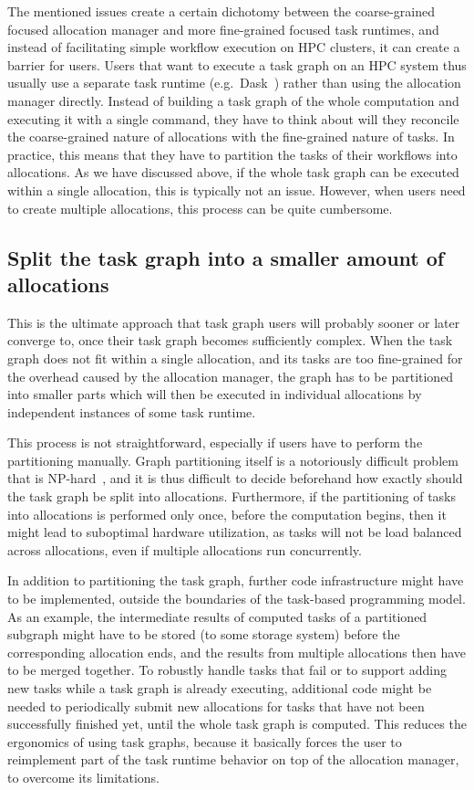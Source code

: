 The mentioned issues create a certain dichotomy between the coarse-grained focused allocation
manager and more fine-grained focused task runtimes, and instead of facilitating simple workflow
execution on HPC clusters, it can create a barrier for users. Users that want to execute a task
graph on an HPC system thus usually use a separate task runtime (e.g.\
Dask~\cite{dask}) rather than using the allocation manager directly. Instead of
building a task graph of the whole computation and executing it with a single command, they have to
think about will they reconcile the coarse-grained nature of allocations with the fine-grained
nature of tasks. In practice, this means that they have to partition the tasks of their workflows
into allocations. As we have discussed above, if the whole task graph can be executed within a
single allocation, this is typically not an issue. However, when users need to create multiple
allocations, this process can be quite cumbersome.

\subsection*{Split the task graph into a smaller amount of allocations}
This is the ultimate approach that task graph users will probably sooner or later converge to, once
their task graph becomes sufficiently complex. When the task graph does not fit within a single
allocation, and its tasks are too fine-grained for the overhead caused by the allocation manager,
the graph has to be partitioned into smaller parts which will then be executed in individual
allocations by independent instances of some task runtime.

This process is not straightforward, especially if users have to perform the partitioning manually.
Graph partitioning itself is a notoriously difficult problem that is
NP-hard~\cite{graph_partitioning}\todo{Ada: Is this OK?}, and it is thus difficult to decide
beforehand how exactly should the task graph be split into allocations. Furthermore, if the
partitioning of tasks into allocations is performed only once, before the computation begins, then
it might lead to suboptimal hardware utilization, as tasks will not be load balanced across
allocations, even if multiple allocations run concurrently.

In addition to partitioning the task graph, further code infrastructure might have to be
implemented, outside the boundaries of the task-based programming model. As an example, the
intermediate results of computed tasks of a partitioned subgraph might have to be stored (to some
storage system) before the corresponding allocation ends, and the results from multiple allocations
then have to be merged together. To robustly handle tasks that fail or to support adding new tasks
while a task graph is already executing, additional code might be needed to periodically submit new
allocations for tasks that have not been successfully finished yet, until the whole task graph is
computed. This reduces the ergonomics of using task graphs, because it basically forces the user to
reimplement part of the task runtime behavior on top of the allocation manager, to overcome its
limitations.

